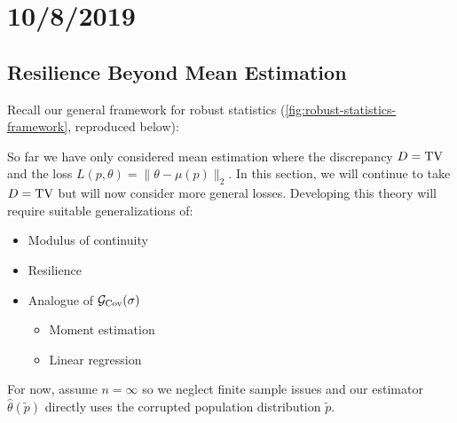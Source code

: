 \section{10/8/2019}

\subsection{Resilience Beyond Mean Estimation}

Recall our general framework for robust statistics
(\cref{fig:robust-statistics-framework}, reproduced below):
\begin{figure}[H]
    \centerline{
    }
\end{figure}
So far we have only considered mean estimation where
the discrepancy $D = \operatorname{TV}$ and the loss
$L(p, \theta) = \|\theta - \mu(p)\|_2$.
In this section, we will continue to take $D = \operatorname{TV}$ but will
now consider more general losses. Developing this theory will
require suitable generalizations of:
\begin{itemize}
  \item Modulus of continuity
  \item Resilience
  \item Analogue of $\mathcal{G}_{\operatorname{Cov}}(\sigma)$
    \begin{itemize}
      \item Moment estimation
      \item Linear regression
    \end{itemize}
\end{itemize}


For now, assume $n = \infty$ so we neglect finite sample issues
and our estimator $\hat\theta(\tilde{p})$ directly uses the
corrupted population distribution $\tilde{p}$.

